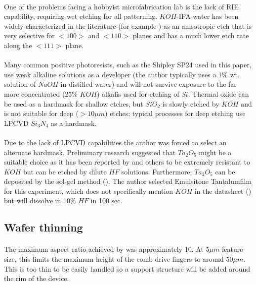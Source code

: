 \documentclass[twocolumn]{article}
\begin{document}
\paragraph*{}
One of the problems facing a hobbyist microfabrication lab is the lack of RIE capability, requiring
wet etching for all patterning. $KOH$-IPA-water has been widely characterized in the literature (for
example \cite{SmoothWalls}) as an anisotropic etch that is very selective for $<100>$ and $<110>$
planes and has a much lower etch rate along the $<111>$ plane.

\paragraph*{}
Many common positive photoresists, such as the Shipley SP24 used in this paper, use weak alkaline
solutions as a developer (the author typically uses a 1\% wt. solution of $NaOH$ in distilled water)
and will not survive exposure to the far more concentrated (25\% $KOH$) alkalis used for etching of
$Si$. Thermal oxide can be used as a hardmask for shallow etches, but $SiO_2$ is slowly etched by $KOH$
and is not suitable for deep ($>10 \mu m$) etches; typical processes for deep etching use LPCVD
$Si_3N_4$ as a hardmask.

\paragraph*{}
Due to the lack of LPCVD capabilities the author was forced to select an alternate hardmask.
Preliminary research suggested that $Ta_2O_5$ might be a suitable choice as it has been reported by
\cite{Christiansen} and others to be extremely resistant to $KOH$ but can be etched by dilute $HF$
solutions. Furthermore, $Ta_2O_5$ can be deposited by the sol-gel method (\cite{Dielectric}). The
author selected Emulsitone Tantalumfilm for this experiment, which does not specifically mention
$KOH$ in the datasheet (\cite{Taf}) but will dissolve in 10\% $HF$ in 100 sec.

\subsection{Wafer thinning}
\paragraph*{}
The maximum aspect ratio achieved by \cite{SmoothWalls} was approximately 10. At $5 \mu m$ feature
size, this limits the maximum height of the comb drive fingers to around $50 \mu m$. This is too
thin to be easily handled so a support structure will be added around the rim of the device.
\end{document}
